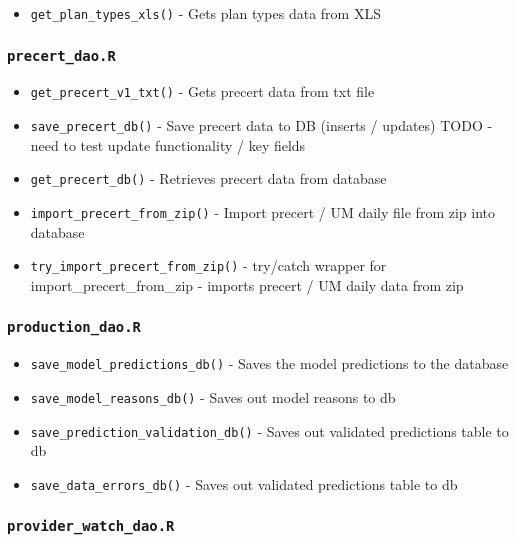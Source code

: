 \documentclass[
]{book}
\providecommand{\tightlist}{%
  \setlength{\itemsep}{0pt}\setlength{\parskip}{0pt}}
\begin{document}
\begin{itemize}
\tightlist
\item
  \texttt{get\_plan\_types\_xls()} - Gets plan types data from XLS
\end{itemize}

\hypertarget{precert_dao.r}{%
\subsubsection{\texorpdfstring{\texttt{precert\_dao.R}}{precert\_dao.R}}\label{precert_dao.r}}

\begin{itemize}
\tightlist
\item
  \texttt{get\_precert\_v1\_txt()} - Gets precert data from txt file
\item
  \texttt{save\_precert\_db()} - Save precert data to DB (inserts / updates) TODO - need to test update functionality / key fields
\item
  \texttt{get\_precert\_db()} - Retrieves precert data from database
\item
  \texttt{import\_precert\_from\_zip()} - Import precert / UM daily file from zip into database
\item
  \texttt{try\_import\_precert\_from\_zip()} - try/catch wrapper for import\_precert\_from\_zip - imports precert / UM daily data from zip
\end{itemize}

\hypertarget{production_dao.r}{%
\subsubsection{\texorpdfstring{\texttt{production\_dao.R}}{production\_dao.R}}\label{production_dao.r}}

\begin{itemize}
\tightlist
\item
  \texttt{save\_model\_predictions\_db()} - Saves the model predictions to the database
\item
  \texttt{save\_model\_reasons\_db()} - Saves out model reasons to db
\item
  \texttt{save\_prediction\_validation\_db()} - Saves out validated predictions table to db
\item
  \texttt{save\_data\_errors\_db()} - Saves out validated predictions table to db
\end{itemize}

\hypertarget{provider_watch_dao.r}{%
\subsubsection{\texorpdfstring{\texttt{provider\_watch\_dao.R}}{provider\_watch\_dao.R}}\label{provider_watch_dao.r}}
\end{document}
